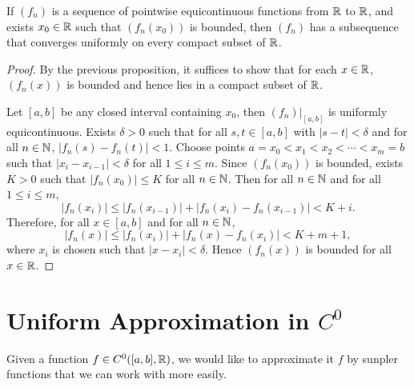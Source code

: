 \begin{cl}
    If $(f_n)$ is a sequence of pointwise equicontinuous functions from ${\mathbb R}$ to ${\mathbb R}$, and exists $x_0 \in {\mathbb R}$ such that $(f_n(x_0))$ is bounded, then $(f_n)$ has a subsequence that converges uniformly on every compact subset of ${\mathbb R}$.
    \begin{proof}
        By the previous proposition, it suffices to show that for each $x \in {\mathbb R}$, $(f_n(x))$ is bounded and hence lies in a compact subset of ${\mathbb R}$. 

        Let $[a, b]$ be any closed interval containing $x_0$, then $(f_n)|_{[a, b]}$ is uniformly equicontinuous. Exists $\delta > 0$ such that for all $s, t \in [a, b]$ with $|s - t| < \delta$ and for all $n \in {\mathbb N}$, $|f_n(s) - f_n(t)| < 1$. Choose points $a = x_0 < x_1 < x_2 < \cdots < x_m = b$ such that $|x_{i} - x_{i-1}| < \delta$ for all $1 \leq i \leq m$. Since $(f_n(x_0))$ is bounded, exists $K > 0$ such that $|f_n(x_0)| \leq K$ for all $n \in {\mathbb N}$. Then for all $n \in {\mathbb N}$ and for all $1 \leq i \leq m$,
        \[
        |f_n(x_i)| \leq |f_n(x_{i-1})| + |f_n(x_i) - f_n(x_{i-1})| < K + i.
        \]
        Therefore, for all $x \in [a, b]$ and for all $n \in {\mathbb N}$,
        \[
        |f_n(x)| \leq |f_n(x_i)| + |f_n(x) - f_n(x_i)| < K + m + 1,
        \]
        where $x_i$ is chosen such that $|x - x_i| < \delta$. Hence $(f_n(x))$ is bounded for all $x \in {\mathbb R}$.
    \end{proof}
\end{cl}


\section{Uniform Approximation in $C^0$}

Given a function $f \in C^0([a, b], {\mathbb R})$, we would like to approximate it $f$ by sunpler functions that we can work with more easily.

